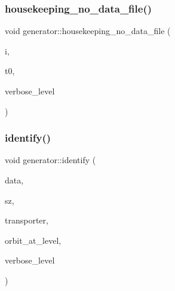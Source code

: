 \subsubsection{\texorpdfstring{housekeeping\+\_\+no\+\_\+data\+\_\+file()}{housekeeping\_no\_data\_file()}}
{\footnotesize\ttfamily void generator\+::housekeeping\+\_\+no\+\_\+data\+\_\+file (\begin{DoxyParamCaption}\item[{\mbox{\hyperlink{galois_8h_a09fddde158a3a20bd2dcadb609de11dc}{I\+NT}}}]{i,  }\item[{\mbox{\hyperlink{galois_8h_a09fddde158a3a20bd2dcadb609de11dc}{I\+NT}}}]{t0,  }\item[{\mbox{\hyperlink{galois_8h_a09fddde158a3a20bd2dcadb609de11dc}{I\+NT}}}]{verbose\+\_\+level }\end{DoxyParamCaption})}

\mbox{\label{classgenerator_ae60de24262d09d0dd8224b86e74040f6}} 
\subsubsection{\texorpdfstring{identify()}{identify()}}
{\footnotesize\ttfamily void generator\+::identify (\begin{DoxyParamCaption}\item[{\mbox{\hyperlink{galois_8h_a09fddde158a3a20bd2dcadb609de11dc}{I\+NT}} $\ast$}]{data,  }\item[{\mbox{\hyperlink{galois_8h_a09fddde158a3a20bd2dcadb609de11dc}{I\+NT}}}]{sz,  }\item[{\mbox{\hyperlink{galois_8h_a09fddde158a3a20bd2dcadb609de11dc}{I\+NT}} $\ast$}]{transporter,  }\item[{\mbox{\hyperlink{galois_8h_a09fddde158a3a20bd2dcadb609de11dc}{I\+NT}} \&}]{orbit\+\_\+at\+\_\+level,  }\item[{\mbox{\hyperlink{galois_8h_a09fddde158a3a20bd2dcadb609de11dc}{I\+NT}}}]{verbose\+\_\+level }\end{DoxyParamCaption})}

\mbox{\label{classgenerator_a7869a4ccc807a96d18fa5d535e74cf1e}} 
